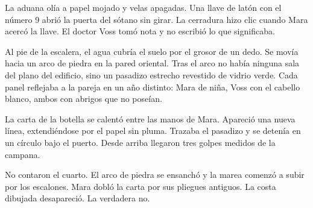 La aduana olía a papel mojado y velas apagadas. Una llave de latón con el
número 9 abrió la puerta del sótano sin girar. La cerradura hizo clic cuando
Mara acercó la llave. El doctor Voss tomó nota y no escribió lo que
significaba.

Al pie de la escalera, el agua cubría el suelo por el grosor de un dedo. Se
movía hacia un arco de piedra en la pared oriental. Tras el arco no había
ninguna sala del plano del edificio, sino un pasadizo estrecho revestido de
vidrio verde. Cada panel reflejaba a la pareja en un año distinto: Mara de
niña, Voss con el cabello blanco, ambos con abrigos que no poseían.

La carta de la botella se calentó entre las manos de Mara. Apareció una
nueva línea, extendiéndose por el papel sin pluma. Trazaba el pasadizo y se
detenía en un círculo bajo el puerto. Desde arriba llegaron tres golpes
medidos de la campana.

No contaron el cuarto. El arco de piedra se ensanchó y la marea comenzó a
subir por los escalones. Mara dobló la carta por sus pliegues antiguos. La
costa dibujada desapareció. La verdadera no.
